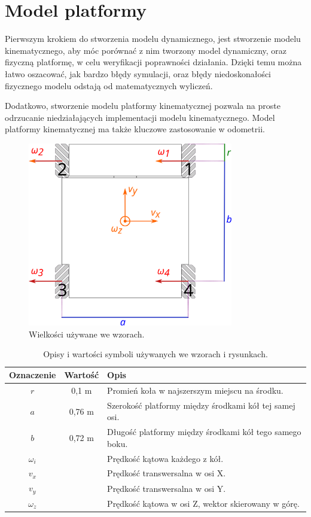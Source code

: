 \chapter{Model platformy}
Pierwszym krokiem do stworzenia modelu dynamicznego, jest stworzenie modelu kinematycznego, aby móc porównać z nim tworzony model dynamiczny, oraz fizyczną platformę,
w celu weryfikacji poprawności działania.
Dzięki temu można łatwo oszacować, jak bardzo błędy symulacji, oraz błędy niedoskonałości fizycznego modelu odstają od matematycznych wyliczeń.

Dodatkowo, stworzenie modelu platformy kinematycznej pozwala na proste odrzucanie niedziałających implementacji modelu kinematycznego.
Model platformy kinematycznej ma także kluczowe zastosowanie w odometrii.

\begin{figure}[H]
\centering
 \includegraphics[width=0.8\textwidth]{graphics/base_dims.pdf}
\caption{Wielkości używane we wzorach.}
\label{fig:base_dims}
\end{figure} 

\begin{table}
\centering
\begin{tabular}{c c l}
Oznaczenie & Wartość & Opis \\
\hline
$r$ & 0,1 m & Promień koła w najszerszym miejscu na środku. \\
$a$ & 0,76 m & Szerokość platformy między środkami kół tej samej osi. \\
$b$ & 0,72 m & Długość platformy między środkami kół tego samego boku. \\
$\omega_i$ & & Prędkość kątowa każdego z kół. \\
$v_x$ & & Prędkość transwersalna w osi X. \\
$v_y$ & & Prędkość transwersalna w osi Y. \\
$\omega_z$ & & Prędkość kątowa w osi Z, wektor skierowany w górę. \\
\end{tabular}
\caption{Opisy i wartości symboli używanych we wzorach i rysunkach.}
\label{tab:dims}
\end{table}

